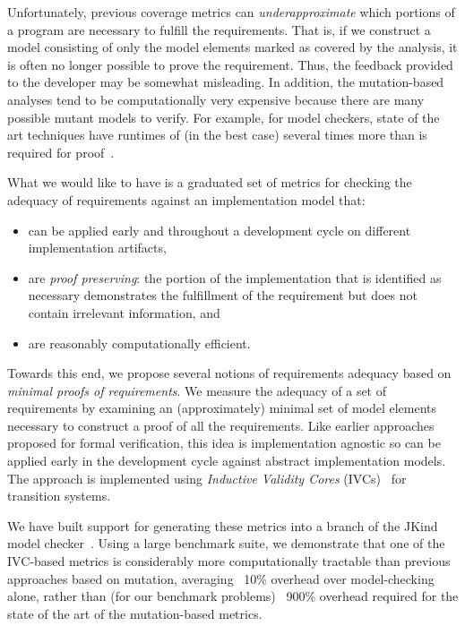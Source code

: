Unfortunately, previous coverage metrics can {\em underapproximate} which portions of a program are necessary to fulfill the requirements.  That is, if we construct a model consisting of only the model elements marked as covered by the analysis, it is often no longer possible to prove the requirement.  Thus, the feedback provided to the developer may be somewhat misleading.
In addition, the mutation-based analyses tend to be computationally very expensive because there are many possible mutant models to verify.  For example, for model checkers, state of the art techniques have runtimes of (in the best case) several times more than is required for proof~\cite{chockler2010coverage}.

What we would like to have is a graduated set of metrics for checking the adequacy of requirements against an implementation model that:
\begin{itemize}
    \item can be applied early and throughout a development cycle on different implementation artifacts,
    \item are {\em proof preserving}: the portion of the implementation that is identified as necessary demonstrates the
        fulfillment of the requirement but does not contain irrelevant information, and
    \item are reasonably computationally efficient.
\end{itemize}

\noindent Towards this end, we propose several notions of requirements adequacy based on {\em minimal proofs of requirements}.  We measure the adequacy of a set of requirements by examining an (approximately) minimal set of model elements necessary to construct a proof of all the requirements.  Like earlier approaches proposed for formal verification, this idea is implementation agnostic so can be applied early in the development cycle against abstract implementation models.  The approach is implemented using {\em Inductive Validity Cores} (IVCs)~\cite{Ghass16} for transition systems.  

We have built support for generating these metrics into a branch of the JKind model checker~\cite{jkind}.  Using a large benchmark suite, we demonstrate that one of the IVC-based metrics is considerably more computationally tractable than previous approaches based on mutation, averaging ~10\% overhead over model-checking alone, rather than (for our benchmark problems) ~900\% overhead required for the state of the art of the mutation-based metrics.  

